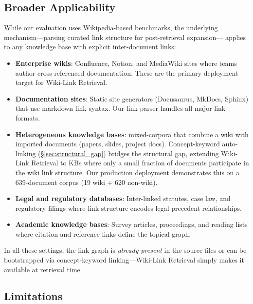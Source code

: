 \documentclass[sigconf,review]{acmart}
\newcommand{\sys}{Wiki-Link Retrieval\xspace}
\begin{document}
\subsection{Broader Applicability}

While our evaluation uses Wikipedia-based benchmarks, the underlying
mechanism---parsing curated link structure for post-retrieval expansion---
applies to any knowledge base with explicit inter-document links:

\begin{itemize}
  \item \textbf{Enterprise wikis}: Confluence, Notion, and MediaWiki sites where teams author cross-referenced documentation.  These are the primary deployment target for \sys.
  \item \textbf{Documentation sites}: Static site generators (Docusaurus, MkDocs, Sphinx) that use markdown link syntax.  Our link parser handles all major link formats.
  \item \textbf{Heterogeneous knowledge bases}: mixed-corpora that combine a wiki with imported documents (papers, slides, project docs).  Concept-keyword auto-linking (\S\ref{sec:structural_gap}) bridges the structural gap, extending \sys to KBs where only a small fraction of documents participate in the wiki link structure.  Our production deployment demonstrates this on a 639-document corpus (19 wiki + 620 non-wiki).
  \item \textbf{Legal and regulatory databases}: Inter-linked statutes, case law, and regulatory filings where link structure encodes legal precedent relationships.
  \item \textbf{Academic knowledge bases}: Survey articles, proceedings, and reading lists where citation and reference links define the topical graph.
\end{itemize}

In all these settings, the link graph is \emph{already present} in the
source files or can be bootstrapped via concept-keyword linking---\sys simply makes it available at retrieval time.

\subsection{Limitations}
\end{document}
